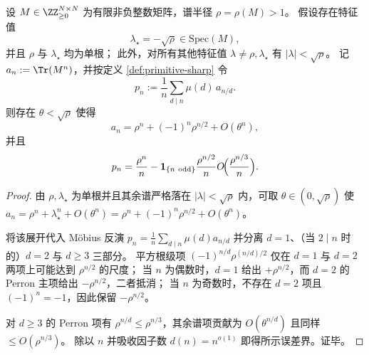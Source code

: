 \begin{theorem}[负平方根模态的二因子消去律]\label{thm:primitive-odd-even-sqrt-cancellation}
设 \(M\in\ZZ_{\ge 0}^{N\times N}\) 为有限非负整数矩阵，谱半径 \(\rho=\rho(M)>1\)。
假设存在特征值
\[
\lambda_\star=-\sqrt{\rho}\in\mathrm{Spec}(M),
\]
并且 \(\rho\) 与 \(\lambda_\star\) 均为单根；
此外，对所有其他特征值 \(\lambda\neq \rho,\lambda_\star\) 有 \(|\lambda|<\sqrt{\rho}\)。
记 \(a_n:=\Tr(M^n)\)，并按定义 \ref{def:primitive-sharp} 令
\[
p_n:=\frac1n\sum_{d\mid n}\mu(d)\,a_{n/d}.
\]
则存在 \(\theta<\sqrt{\rho}\) 使得
\[
a_n=\rho^{n}+(-1)^n\rho^{n/2}+O(\theta^{n}),
\]
并且
\[
p_n=\frac{\rho^{n}}{n}-\mathbf 1_{\{n\ \mathrm{odd}\}}\frac{\rho^{n/2}}{n}
O\!\Bigl(\frac{\rho^{n/3}}{n}\Bigr).
\]
\end{theorem}
\begin{proof}
由 \(\rho,\lambda_\star\) 为单根并且其余谱严格落在 \(|\lambda|<\sqrt{\rho}\) 内，可取 \(\theta\in(0,\sqrt{\rho})\) 使
\(
a_n=\rho^n+\lambda_\star^n+O(\theta^n)
=\rho^n+(-1)^n\rho^{n/2}+O(\theta^n)
\)。
\par
将该展开代入 Möbius 反演
\(
p_n=\frac1n\sum_{d\mid n}\mu(d)a_{n/d}
\)
并分离 \(d=1\)、（当 \(2\mid n\) 时的）\(d=2\) 与 \(d\ge 3\) 三部分。
平方根级项 \((-1)^{n/d}\rho^{(n/d)/2}\) 仅在 \(d=1\) 与 \(d=2\) 两项上可能达到 \(\rho^{n/2}\) 的尺度；
当 \(n\) 为偶数时，\(d=1\) 给出 \(+\rho^{n/2}\)，而 \(d=2\) 的 Perron 主项给出 \(-\rho^{n/2}\)，二者抵消；
当 \(n\) 为奇数时，不存在 \(d=2\) 项且 \((-1)^n=-1\)，因此保留 \(-\rho^{n/2}\)。
\par
对 \(d\ge 3\) 的 Perron 项有 \(\rho^{n/d}\le \rho^{n/3}\)，其余谱项贡献为 \(O(\theta^{n/d})\) 且同样 \(\le O(\rho^{n/3})\)。
除以 \(n\) 并吸收因子数 \(d(n)=n^{o(1)}\) 即得所示误差界。证毕。
\end{proof}
